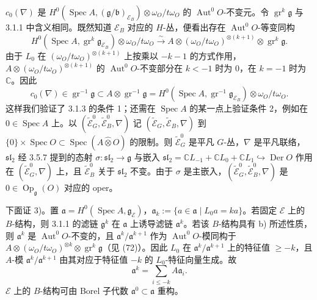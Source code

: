 $c_{0}(\nabla)$ 是 $H^{0}(\operatorname{Spec}A,(\mathfrak{g}/\mathfrak{b})_{\mathcal{E}_{B}})\otimes\omega_{O}/t\omega_{O}$ 的 $\operatorname{Aut}^{0}O$-不变元。令 $\operatorname{gr}^{k}\mathfrak{g}$ 与 3.1.1 中含义相同。既然知道 $\mathcal{E}_{B}$ 对应的 $H$-丛，便看出存在 $\operatorname{Aut}^{0}O$-等变同构
\begin{equation}\tag{72}
H^{0}(\operatorname{Spec}A,\operatorname{gr}^{k}\mathfrak{g}_{\mathcal{E}_{B}})\otimes\omega_{O}/t\omega_{O}\xrightarrow{\sim}A\otimes(\omega_{O}/t\omega_{O})^{\otimes(k+1)}\otimes\operatorname{gr}^{k}\mathfrak{g}.
\end{equation}
由于 $L_{0}$ 在 $(\omega_{O}/t\omega_{O})^{\otimes(k+1)}$ 上按乘以 $-k-1$ 的方式作用，$A\otimes(\omega_{O}/t\omega_{O})^{\otimes(k+1)}$ 的 $\operatorname{Aut}^{0}O$-不变部分在 $k<-1$ 时为 $0$，在 $k=-1$ 时为 $\mathbb{C}$。因此
\[
c_{0}(\nabla)\in\operatorname{gr}^{-1}\mathfrak{g}\subset A\otimes\operatorname{gr}^{-1}\mathfrak{g}=H^{0}(\operatorname{Spec}A,\operatorname{gr}^{-1}\mathfrak{g}_{\mathcal{E}_{B}})\otimes\omega_{O}/t\omega_{O}.
\]
这样我们验证了 3.1.3 的条件 1；还需在 $\operatorname{Spec}A$ 的某一点上验证条件 2，例如在 $0\in\operatorname{Spec}A$ 上。以 $(\widetilde{\mathcal{E}}^{0}_{G},\widetilde{\mathcal{E}}^{0}_{B},\nabla)$ 记 $(\widetilde{\mathcal{E}}_{G},\widetilde{\mathcal{E}}_{B},\nabla)$ 到 $\{0\}\times\operatorname{Spec}O\subset\operatorname{Spec}(A\widehat\otimes O)$ 的限制。则 $\widetilde{\mathcal{E}}^{0}_{G}$ 是平凡 $G$-丛，$\nabla$ 是平凡联络，$\mathfrak{sl}_{2}$ 经 3.5.7 提到的态射 $\sigma:\mathfrak{sl}_{2}\to\mathfrak{g}$ 与嵌入 $\mathfrak{sl}_{2}=\mathbb{C}L_{-1}+\mathbb{C}L_{0}+\mathbb{C}L_{1}\hookrightarrow\operatorname{Der}O$ 作用在 $(\widetilde{\mathcal{E}}^{0}_{G},\nabla)$ 上，且 $\widetilde{\mathcal{E}}^{0}_{B}$ 关于 $\mathfrak{sl}_{2}$ 不变。由于 $\sigma$ 是主嵌入，$(\widetilde{\mathcal{E}}^{0}_{G},\widetilde{\mathcal{E}}^{0}_{B},\nabla)$ 是 $0\in\operatorname{Op}_{\mathfrak{g}}(O)$ 对应的 oper。

下面证 3)。置 $\mathfrak{a}=H^{0}(\operatorname{Spec}A,\mathfrak{g}_{\mathcal{E}})$，$\mathfrak{a}_{k}:=\{a\in\mathfrak{a}\mid L_{0}a=ka\}$。若固定 $\mathcal{E}$ 上的 $B$-结构，则 3.1.1 的滤链 $\mathfrak{g}^{k}$ 在 $\mathfrak{a}$ 上诱导滤链 $\mathfrak{a}^{k}$。若该 $B$-结构具有 b) 所述性质，则 $\mathfrak{a}^{k}$ 是 $\operatorname{Aut}^{0}O$-不变的，且 $\mathfrak{a}^{k}/\mathfrak{a}^{k+1}$ 作为 $\operatorname{Aut}^{0}O$-模同构于 $A\otimes(\omega_{O}/t\omega_{O})^{\otimes k}\otimes\operatorname{gr}^{k}\mathfrak{g}$（见 (72)）。因此 $L_{0}$ 在 $\mathfrak{a}^{k}/\mathfrak{a}^{k+1}$ 上的特征值 $\ge-k$，且 $A$-模 $\mathfrak{a}^{k}/\mathfrak{a}^{k+1}$ 由其对应于特征值 $-k$ 的 $L_{0}$-特征向量生成。故
\begin{equation}\tag{73}
\mathfrak{a}^{k}=\sum_{i\le-k}A\mathfrak{a}_{i}.
\end{equation}
$\mathcal{E}$ 上的 $B$-结构可由 Borel 子代数 $\mathfrak{a}^{0}\subset\mathfrak{a}$ 重构。

